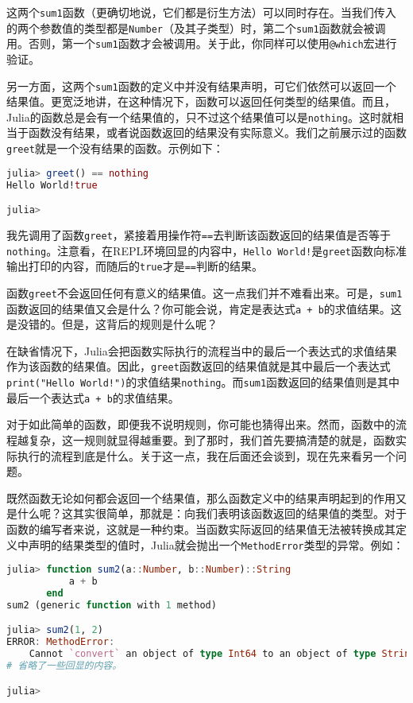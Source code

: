 这两个\verb`sum1`函数（更确切地说，它们都是衍生方法）可以同时存在。当我们传入的两个参数值的类型都是\verb`Number`（及其子类型）时，第二个\verb`sum1`函数就会被调用。否则，第一个\verb`sum1`函数才会被调用。关于此，你同样可以使用\verb`@which`宏进行验证。

另一方面，这两个\verb`sum1`函数的定义中并没有结果声明，可它们依然可以返回一个结果值。更宽泛地讲，在这种情况下，函数可以返回任何类型的结果值。而且，Julia的函数总是会有一个结果值的，只不过这个结果值可以是\verb`nothing`。这时就相当于函数没有结果，或者说函数返回的结果没有实际意义。我们之前展示过的函数\verb`greet`就是一个没有结果的函数。示例如下：

\begin{lstlisting}[language=julia]
julia> greet() == nothing
Hello World!true

julia> 
\end{lstlisting}

我先调用了函数\verb`greet`，紧接着用操作符\verb`==`去判断该函数返回的结果值是否等于\verb`nothing`。注意看，在REPL环境回显的内容中，\verb`Hello World!`是\verb`greet`函数向标准输出打印的内容，而随后的\verb`true`才是\verb`==`判断的结果。

函数\verb`greet`不会返回任何有意义的结果值。这一点我们并不难看出来。可是，\verb`sum1`函数返回的结果值又会是什么？你可能会说，肯定是表达式\verb`a + b`的求值结果。这是没错的。但是，这背后的规则是什么呢？

在缺省情况下，Julia会把函数实际执行的流程当中的最后一个表达式的求值结果作为该函数的结果值。因此，\verb`greet`函数返回的结果值就是其中最后一个表达式\verb`print("Hello World!")`的求值结果\verb`nothing`。而\verb`sum1`函数返回的结果值则是其中最后一个表达式\verb`a + b`的求值结果。

对于如此简单的函数，即便我不说明规则，你可能也猜得出来。然而，函数中的流程越复杂，这一规则就显得越重要。到了那时，我们首先要搞清楚的就是，函数实际执行的流程到底是什么。关于这一点，我在后面还会谈到，现在先来看另一个问题。

既然函数无论如何都会返回一个结果值，那么函数定义中的结果声明起到的作用又是什么呢？这其实很简单，那就是：向我们表明该函数返回的结果值的类型。对于函数的编写者来说，这就是一种约束。当函数实际返回的结果值无法被转换成其定义中声明的结果类型的值时，Julia就会抛出一个\verb`MethodError`类型的异常。例如：

\begin{lstlisting}[language=julia]
julia> function sum2(a::Number, b::Number)::String
           a + b
       end
sum2 (generic function with 1 method)

julia> sum2(1, 2)
ERROR: MethodError: 
    Cannot `convert` an object of type Int64 to an object of type String
# 省略了一些回显的内容。

julia> 
\end{lstlisting}

